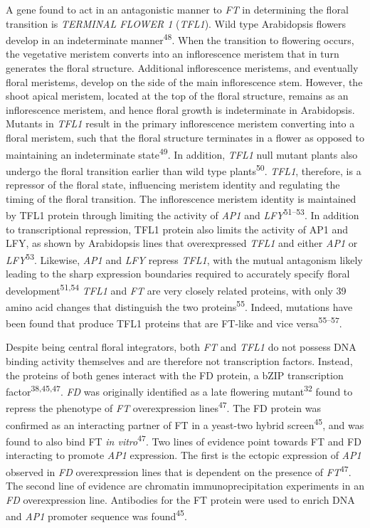 \documentclass[12pt,]{book}
\begin{document}
A gene found to act in an antagonistic manner to \emph{FT} in
determining the floral transition is \emph{TERMINAL FLOWER 1}
(\emph{TFL1}). Wild type Arabidopsis flowers develop in an indeterminate
manner\textsuperscript{48}. When the transition to flowering occurs, the
vegetative meristem converts into an inflorescence meristem that in turn
generates the floral structure. Additional inflorescence meristems, and
eventually floral meristems, develop on the side of the main
inflorescence stem. However, the shoot apical meristem, located at the
top of the floral structure, remains as an inflorescence meristem, and
hence floral growth is indeterminate in Arabidopsis. Mutants in
\emph{TFL1} result in the primary inflorescence meristem converting into
a floral meristem, such that the floral structure terminates in a flower
as opposed to maintaining an indeterminate state\textsuperscript{49}. In
addition, \emph{TFL1} null mutant plants also undergo the floral
transition earlier than wild type plants\textsuperscript{50}.
\emph{TFL1}, therefore, is a repressor of the floral state, influencing
meristem identity and regulating the timing of the floral transition.
The inflorescence meristem identity is maintained by TFL1 protein
through limiting the activity of \emph{AP1} and
\emph{LFY}\textsuperscript{51--53}. In addition to transcriptional
repression, TFL1 protein also limits the activity of AP1 and LFY, as
shown by Arabidopsis lines that overexpressed \emph{TFL1} and either
\emph{AP1} or \emph{LFY}\textsuperscript{53}. Likewise, \emph{AP1} and
\emph{LFY} repress \emph{TFL1}, with the mutual antagonism likely
leading to the sharp expression boundaries required to accurately
specify floral development\textsuperscript{51,54} \emph{TFL1} and
\emph{FT} are very closely related proteins, with only 39 amino acid
changes that distinguish the two proteins\textsuperscript{55}. Indeed,
mutations have been found that produce TFL1 proteins that are FT-like
and vice versa\textsuperscript{55--57}.

Despite being central floral integrators, both \emph{FT} and \emph{TFL1}
do not possess DNA binding activity themselves and are therefore not
transcription factors. Instead, the proteins of both genes interact with
the FD protein, a bZIP transcription factor\textsuperscript{38,45,47}.
\emph{FD} was originally identified as a late flowering
mutant\textsuperscript{32} found to repress the phenotype of \emph{FT}
overexpression lines\textsuperscript{47}. The FD protein was confirmed
as an interacting partner of FT in a yeast-two hybrid
screen\textsuperscript{45}, and was found to also bind FT \emph{in
vitro}\textsuperscript{47}. Two lines of evidence point towards FT and
FD interacting to promote \emph{AP1} expression. The first is the
ectopic expression of \emph{AP1} observed in \emph{FD} overexpression
lines that is dependent on the presence of
\emph{FT}\textsuperscript{47}. The second line of evidence are chromatin
immunoprecipitation experiments in an \emph{FD} overexpression line.
Antibodies for the FT protein were used to enrich DNA and \emph{AP1}
promoter sequence was found\textsuperscript{45}.
\end{document}
